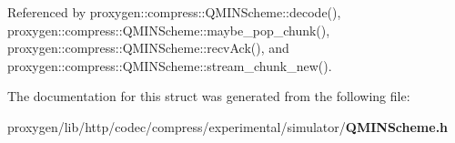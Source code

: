 Referenced by proxygen\+::compress\+::\+Q\+M\+I\+N\+Scheme\+::decode(), proxygen\+::compress\+::\+Q\+M\+I\+N\+Scheme\+::maybe\+\_\+pop\+\_\+chunk(), proxygen\+::compress\+::\+Q\+M\+I\+N\+Scheme\+::recv\+Ack(), and proxygen\+::compress\+::\+Q\+M\+I\+N\+Scheme\+::stream\+\_\+chunk\+\_\+new().



The documentation for this struct was generated from the following file\+:\begin{DoxyCompactItemize}
\item 
proxygen/lib/http/codec/compress/experimental/simulator/{\bf Q\+M\+I\+N\+Scheme.\+h}\end{DoxyCompactItemize}
